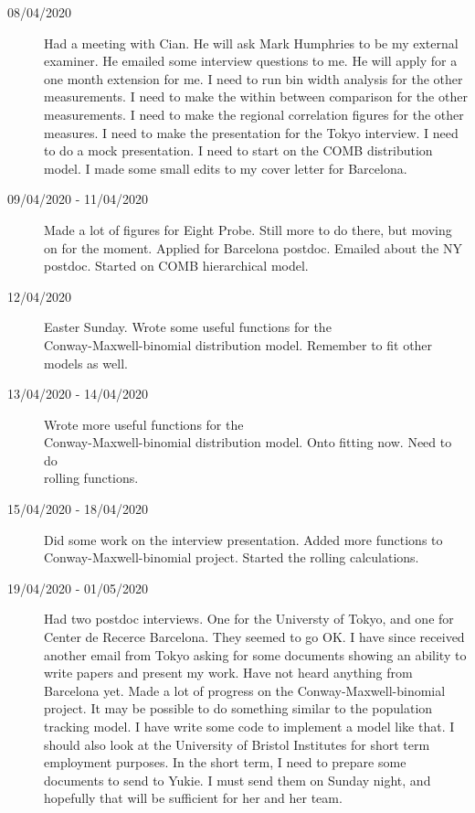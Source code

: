 \documentclass[a4paper,12pt]{article}
\theoremstyle{definition}
\begin{document}
\begin{description}
	\item[08/04/2020] Had a meeting with Cian. He will ask Mark Humphries to be my external examiner. He emailed some interview questions to me. He will apply for a one month extension for me. I need to run bin width analysis for the other measurements. I need to make the within between comparison for the other measurements. I need to make the regional correlation figures for the other measures. I need to make the presentation for the Tokyo interview. I need to do a mock presentation. I need to start on the COMB distribution model. I made some small edits to my cover letter for Barcelona.

	\item[09/04/2020 - 11/04/2020] Made a lot of figures for Eight Probe. Still more to do there, but moving on for the moment. Applied for Barcelona postdoc. Emailed about the NY postdoc. Started on COMB hierarchical model.

	\item[12/04/2020] Easter Sunday. Wrote some useful functions for the \\ Conway-Maxwell-binomial distribution model. Remember to fit other models as well.

	\item[13/04/2020 - 14/04/2020] Wrote more useful functions for the \\ Conway-Maxwell-binomial distribution model. Onto fitting now. Need to do \\ rolling functions.

	\item[15/04/2020 - 18/04/2020] Did some work on the interview presentation. Added more functions to Conway-Maxwell-binomial project. Started the rolling calculations.
	\item[19/04/2020 - 01/05/2020] Had two postdoc interviews. One for the Universty of Tokyo, and one for Center de Recerce Barcelona. They seemed to go OK. I have since received another email from Tokyo asking for some documents showing an ability to write papers and present my work. Have not heard anything from Barcelona yet. Made a lot of progress on the Conway-Maxwell-binomial project. It may be possible to do something similar to the population tracking model. I have write some code to implement a model like that. I should also look at the University of Bristol Institutes for short term employment purposes. In the short term, I need to prepare some documents to send to Yukie. I must send them on Sunday night, and hopefully that will be sufficient for her and her team.


\end{description}
\end{document}
